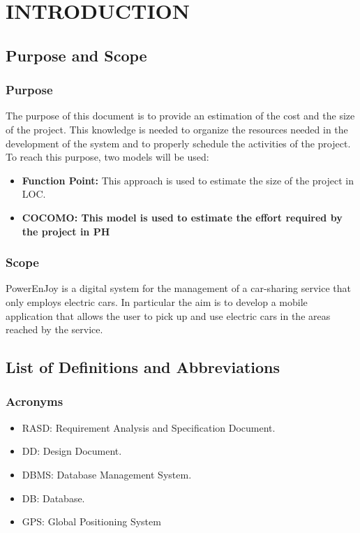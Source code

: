 \section{INTRODUCTION}
\subsection{Purpose and Scope}
\subsubsection{Purpose}
The purpose of this document is to provide an estimation of the cost and the size of the project. This knowledge is needed to organize the resources needed in the development of the system and to properly schedule the activities of the project.\newline
To reach this purpose, two models will be used:
\begin{itemize}
\item \textbf{Function Point:} This approach is used to estimate the size of the project in LOC.
\item \textbf{COCOMO: This model is used to estimate the effort required by the project in PH} 
\end{itemize}

\subsubsection{Scope}
PowerEnJoy is a digital system for the management of a car-sharing service that only employs electric cars. In particular the aim is to develop a mobile application that allows the user to pick up and use electric cars in the areas reached by the service.

\subsection{List of Definitions and Abbreviations} 
\subsubsection{Acronyms}
\begin{itemize}
\item RASD: Requirement Analysis and Specification Document.
\item DD: Design Document.
\item DBMS: Database Management System.
\item DB: Database.

\item GPS: Global Positioning System

\end{itemize}
